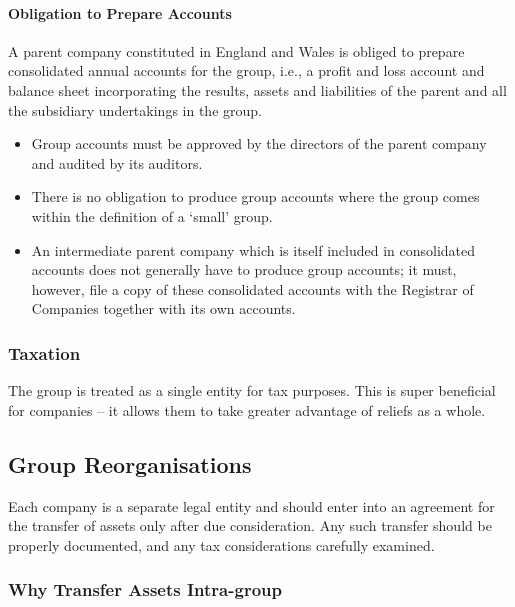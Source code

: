 \documentclass[
]{article}
\providecommand{\tightlist}{%
  \setlength{\itemsep}{0pt}\setlength{\parskip}{0pt}}
\begin{document}
\hypertarget{obligation-to-prepare-accounts}{%
\paragraph{Obligation to Prepare
Accounts}\label{obligation-to-prepare-accounts}}

A parent company constituted in England and Wales is obliged to prepare
consolidated annual accounts for the group, i.e., a profit and loss
account and balance sheet incorporating the results, assets and
liabilities of the parent and all the subsidiary undertakings in the
group.

\begin{itemize}
\tightlist
\item
  Group accounts must be approved by the directors of the parent company
  and audited by its auditors.
\item
  There is no obligation to produce group accounts where the group comes
  within the definition of a `small' group.
\item
  An intermediate parent company which is itself included in
  consolidated accounts does not generally have to produce group
  accounts; it must, however, file a copy of these consolidated accounts
  with the Registrar of Companies together with its own accounts.
\end{itemize}

\hypertarget{taxation}{%
\subsubsection{Taxation}\label{taxation}}

The group is treated as a single entity for tax purposes. This is super
beneficial for companies -- it allows them to take greater advantage of
reliefs as a whole.

\hypertarget{group-reorganisations-1}{%
\subsection{Group Reorganisations}\label{group-reorganisations-1}}

Each company is a separate legal entity and should enter into an
agreement for the transfer of assets only after due consideration. Any
such transfer should be properly documented, and any tax considerations
carefully examined.

\hypertarget{why-transfer-assets-intra-group}{%
\subsubsection{Why Transfer Assets
Intra-group}\label{why-transfer-assets-intra-group}}
\end{document}
